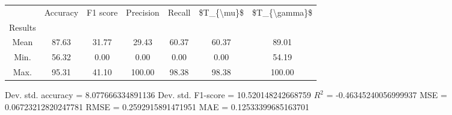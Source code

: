 \begin{tabular}{|c|c|c|c|c|c|c|}
\toprule
{} &  Accuracy &  F1 score &  Precision &  Recall &  \$T\_\{\textbackslash mu\}\$ &  \$T\_\{\textbackslash gamma\}\$ \\
Results &           &           &            &         &            &               \\
\hline
Mean    &     87.63 &     31.77 &      29.43 &   60.37 &      60.37 &         89.01 \\
Min.    &     56.32 &      0.00 &       0.00 &    0.00 &       0.00 &         54.19 \\
Max.    &     95.31 &     41.10 &     100.00 &   98.38 &      98.38 &        100.00 \\
\bottomrule
\end{tabular}

 Dev. std. accuracy = 8.077666334891136
 Dev. std. F1-score = 10.520148242668759
 $R^2$ = -0.46345240056999937
 MSE = 0.06723212820247781
 RMSE = 0.2592915891471951
 MAE = 0.12533399685163701